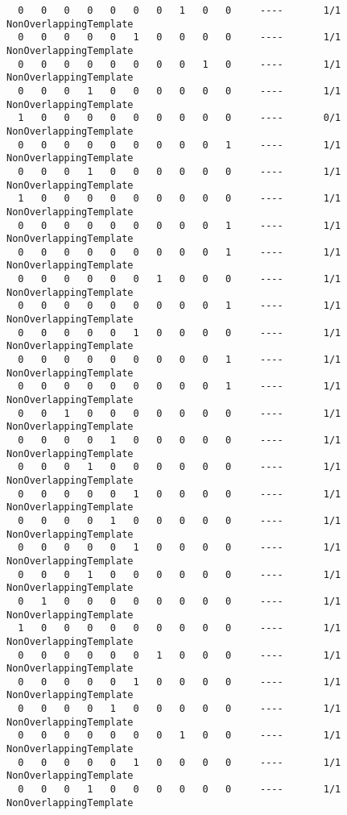 \begin{code}
\begin{verbatim}
  0   0   0   0   0   0   0   1   0   0     ----       1/1       NonOverlappingTemplate
  0   0   0   0   0   1   0   0   0   0     ----       1/1       NonOverlappingTemplate
  0   0   0   0   0   0   0   0   1   0     ----       1/1       NonOverlappingTemplate
  0   0   0   1   0   0   0   0   0   0     ----       1/1       NonOverlappingTemplate
  1   0   0   0   0   0   0   0   0   0     ----       0/1       NonOverlappingTemplate
  0   0   0   0   0   0   0   0   0   1     ----       1/1       NonOverlappingTemplate
  0   0   0   1   0   0   0   0   0   0     ----       1/1       NonOverlappingTemplate
  1   0   0   0   0   0   0   0   0   0     ----       1/1       NonOverlappingTemplate
  0   0   0   0   0   0   0   0   0   1     ----       1/1       NonOverlappingTemplate
  0   0   0   0   0   0   0   0   0   1     ----       1/1       NonOverlappingTemplate
  0   0   0   0   0   0   1   0   0   0     ----       1/1       NonOverlappingTemplate
  0   0   0   0   0   0   0   0   0   1     ----       1/1       NonOverlappingTemplate
  0   0   0   0   0   1   0   0   0   0     ----       1/1       NonOverlappingTemplate
  0   0   0   0   0   0   0   0   0   1     ----       1/1       NonOverlappingTemplate
  0   0   0   0   0   0   0   0   0   1     ----       1/1       NonOverlappingTemplate
  0   0   1   0   0   0   0   0   0   0     ----       1/1       NonOverlappingTemplate
  0   0   0   0   1   0   0   0   0   0     ----       1/1       NonOverlappingTemplate
  0   0   0   1   0   0   0   0   0   0     ----       1/1       NonOverlappingTemplate
  0   0   0   0   0   1   0   0   0   0     ----       1/1       NonOverlappingTemplate
  0   0   0   0   1   0   0   0   0   0     ----       1/1       NonOverlappingTemplate
  0   0   0   0   0   1   0   0   0   0     ----       1/1       NonOverlappingTemplate
  0   0   0   1   0   0   0   0   0   0     ----       1/1       NonOverlappingTemplate
  0   1   0   0   0   0   0   0   0   0     ----       1/1       NonOverlappingTemplate
  1   0   0   0   0   0   0   0   0   0     ----       1/1       NonOverlappingTemplate
  0   0   0   0   0   0   1   0   0   0     ----       1/1       NonOverlappingTemplate
  0   0   0   0   0   1   0   0   0   0     ----       1/1       NonOverlappingTemplate
  0   0   0   0   1   0   0   0   0   0     ----       1/1       NonOverlappingTemplate
  0   0   0   0   0   0   0   1   0   0     ----       1/1       NonOverlappingTemplate
  0   0   0   0   0   1   0   0   0   0     ----       1/1       NonOverlappingTemplate
  0   0   0   1   0   0   0   0   0   0     ----       1/1       NonOverlappingTemplate

\end{verbatim}
\end{code}
